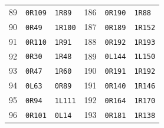 {\begin{longtable}{@{}rll@{\qquad\quad}rll@{}}
89 & \texttt{0R109} & \texttt{1R89} & 186 & \texttt{0R190} & \texttt{1R88}\\
90 & \texttt{0R49} & \texttt{1R100} & 187 & \texttt{0R189} & \texttt{1R152}\\
91 & \texttt{0R110} & \texttt{1R91} & 188 & \texttt{0R192} & \texttt{1R193}\\
92 & \texttt{0R30} & \texttt{1R48} & 189 & \texttt{0L144} & \texttt{1L150}\\
93 & \texttt{0R47} & \texttt{1R60} & 190 & \texttt{0R191} & \texttt{1R192}\\
94 & \texttt{0L63} & \texttt{0R89} & 191 & \texttt{0R140} & \texttt{1R146}\\
95 & \texttt{0R94} & \texttt{1L111} & 192 & \texttt{0R164} & \texttt{1R170}\\
96 & \texttt{0R101} & \texttt{0L14} & 193 & \texttt{0R181} & \texttt{1R138}\\
\bottomrule\end{longtable}
}

